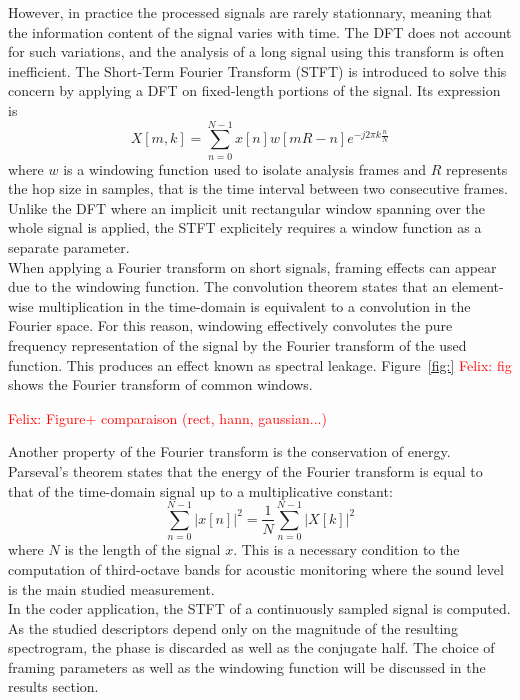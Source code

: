 \documentclass[12pt,times,onecolumn]{article}
\newcommand{\fg}[1]{\textcolor{red}{ Felix: #1}}
\begin{document}
However, in practice the processed signals are rarely stationnary, meaning that the information content of the signal varies with time. The DFT does not account for such variations, and the analysis of a long signal using this transform is often inefficient. The Short-Term Fourier Transform (STFT) is introduced to solve this concern by applying a DFT on fixed-length portions of the signal. Its expression is
\begin{equation}
X[m, k] = \sum\limits_{n = 0}^{N-1} x[n]w[mR-n]e^{-j2\pi k\frac{n}{N}}
\end{equation}
where $w$ is a windowing function used to isolate analysis frames and $R$ represents the hop size in samples, that is the time interval between two consecutive frames. Unlike the DFT where an implicit unit rectangular window spanning over the whole signal is applied, the STFT explicitely requires a window function as a separate parameter.\\

When applying a Fourier transform on short signals, framing effects can appear due to the windowing function. The convolution theorem states that an element-wise multiplication in the time-domain is equivalent to a convolution in the Fourier space. For this reason, windowing effectively convolutes the pure frequency representation of the signal by the Fourier transform of the used function. This produces an effect known as spectral leakage. Figure~\ref{fig:} \fg{fig} shows the Fourier transform of common windows.

\fg{Figure+ comparaison (rect, hann, gaussian...)}


Another property of the Fourier transform is the conservation of energy. Parseval's theorem states that the energy of the Fourier transform is equal to that of the time-domain signal up to a multiplicative constant:
\begin{equation}
\sum\limits_{n=0}^{N-1}|x[n]|^2 = \frac{1}{N}\sum\limits_{n=0}^{N-1}|X[k]|^2
\end{equation}
where $N$ is the length of the signal $x$. This is a necessary condition to the computation of third-octave bands for acoustic monitoring where the sound level is the main studied measurement.\\

In the coder application, the STFT of a continuously sampled signal is computed. As the studied descriptors depend only on the magnitude of the resulting spectrogram, the phase is discarded as well as the conjugate half. The choice of framing parameters as well as the windowing function will be discussed in the results section.
\end{document}
